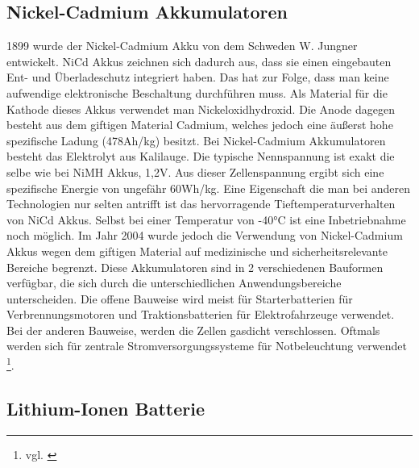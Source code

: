 \subsection{Nickel-Cadmium Akkumulatoren}
1899 wurde der Nickel-Cadmium Akku von dem Schweden W. Jungner entwickelt. NiCd Akkus zeichnen sich dadurch aus, dass sie einen eingebauten Ent- und Überladeschutz integriert haben. Das hat zur Folge, dass man keine aufwendige elektronische Beschaltung durchführen muss. Als Material für die Kathode dieses Akkus verwendet man Nickeloxidhydroxid. Die Anode dagegen besteht aus dem giftigen Material Cadmium, welches jedoch eine äußerst hohe spezifische Ladung (478Ah/kg) besitzt. Bei Nickel-Cadmium Akkumulatoren besteht das Elektrolyt aus Kalilauge. Die typische Nennspannung ist exakt die selbe wie bei NiMH Akkus, 1,2V. Aus dieser Zellenspannung ergibt sich eine spezifische Energie von ungefähr 60Wh/kg. Eine Eigenschaft die man bei anderen Technologien nur selten antrifft ist das hervorragende Tieftemperaturverhalten von NiCd Akkus. Selbst bei einer Temperatur von -40°C ist eine Inbetriebnahme noch möglich. Im Jahr 2004 wurde jedoch die Verwendung von Nickel-Cadmium Akkus wegen dem giftigen Material auf medizinische und sicherheitsrelevante Bereiche begrenzt. Diese Akkumulatoren sind in 2 verschiedenen Bauformen verfügbar, die sich durch die unterschiedlichen Anwendungsbereiche unterscheiden. Die offene Bauweise wird meist für Starterbatterien für Verbrennungsmotoren und Traktionsbatterien für Elektrofahrzeuge verwendet. Bei der anderen Bauweise, werden die Zellen gasdicht verschlossen. Oftmals werden sich für zentrale Stromversorgungssysteme für Notbeleuchtung verwendet \footnote{vgl. \cite{Nickel-Cadmium-Akkumulator}}.
\newpage

\subsection{Lithium-Ionen Batterie}

